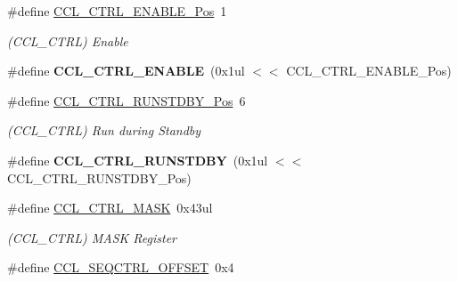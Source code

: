 \begin{DoxyCompactItemize}
\item 
\hypertarget{group___s_a_m_l21___c_c_l_gab7d01a15f8a8b66256c97685bf99fbdb}{}\#define \hyperlink{group___s_a_m_l21___c_c_l_gab7d01a15f8a8b66256c97685bf99fbdb}{C\+C\+L\+\_\+\+C\+T\+R\+L\+\_\+\+E\+N\+A\+B\+L\+E\+\_\+\+Pos}~1\label{group___s_a_m_l21___c_c_l_gab7d01a15f8a8b66256c97685bf99fbdb}

\begin{DoxyCompactList}\small\item\em (C\+C\+L\+\_\+\+C\+T\+R\+L) Enable \end{DoxyCompactList}\item 
\hypertarget{group___s_a_m_l21___c_c_l_gadd54ee9924f68dbe84ea1f4d3dfa0bb6}{}\#define {\bfseries C\+C\+L\+\_\+\+C\+T\+R\+L\+\_\+\+E\+N\+A\+B\+L\+E}~(0x1ul $<$$<$ C\+C\+L\+\_\+\+C\+T\+R\+L\+\_\+\+E\+N\+A\+B\+L\+E\+\_\+\+Pos)\label{group___s_a_m_l21___c_c_l_gadd54ee9924f68dbe84ea1f4d3dfa0bb6}

\item 
\hypertarget{group___s_a_m_l21___c_c_l_ga3a854eeed76e480b040f7a45ed26f491}{}\#define \hyperlink{group___s_a_m_l21___c_c_l_ga3a854eeed76e480b040f7a45ed26f491}{C\+C\+L\+\_\+\+C\+T\+R\+L\+\_\+\+R\+U\+N\+S\+T\+D\+B\+Y\+\_\+\+Pos}~6\label{group___s_a_m_l21___c_c_l_ga3a854eeed76e480b040f7a45ed26f491}

\begin{DoxyCompactList}\small\item\em (C\+C\+L\+\_\+\+C\+T\+R\+L) Run during Standby \end{DoxyCompactList}\item 
\hypertarget{group___s_a_m_l21___c_c_l_ga251e19b8639f00f8c3881b5294f9b7db}{}\#define {\bfseries C\+C\+L\+\_\+\+C\+T\+R\+L\+\_\+\+R\+U\+N\+S\+T\+D\+B\+Y}~(0x1ul $<$$<$ C\+C\+L\+\_\+\+C\+T\+R\+L\+\_\+\+R\+U\+N\+S\+T\+D\+B\+Y\+\_\+\+Pos)\label{group___s_a_m_l21___c_c_l_ga251e19b8639f00f8c3881b5294f9b7db}

\item 
\hypertarget{group___s_a_m_l21___c_c_l_ga571cfa892b25f20433df2ea90008aba5}{}\#define \hyperlink{group___s_a_m_l21___c_c_l_ga571cfa892b25f20433df2ea90008aba5}{C\+C\+L\+\_\+\+C\+T\+R\+L\+\_\+\+M\+A\+S\+K}~0x43ul\label{group___s_a_m_l21___c_c_l_ga571cfa892b25f20433df2ea90008aba5}

\begin{DoxyCompactList}\small\item\em (C\+C\+L\+\_\+\+C\+T\+R\+L) M\+A\+S\+K Register \end{DoxyCompactList}\item 
\hypertarget{group___s_a_m_l21___c_c_l_gae649ffdde33941cf69204d42db58a328}{}\#define \hyperlink{group___s_a_m_l21___c_c_l_gae649ffdde33941cf69204d42db58a328}{C\+C\+L\+\_\+\+S\+E\+Q\+C\+T\+R\+L\+\_\+\+O\+F\+F\+S\+E\+T}~0x4\label{group___s_a_m_l21___c_c_l_gae649ffdde33941cf69204d42db58a328}


\end{DoxyCompactItemize}

